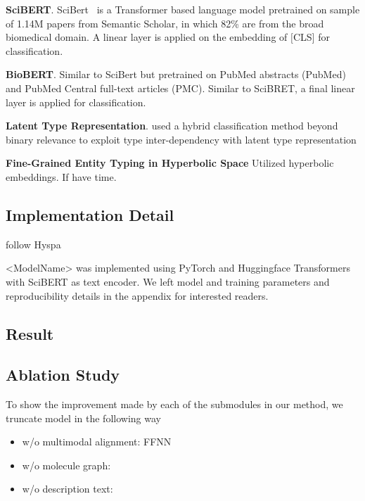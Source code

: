 \noindent \textbf{SciBERT}. SciBert~\cite{scibert} is a Transformer based language model pretrained on sample of 1.14M papers from Semantic Scholar, in which 82\% are from the broad biomedical domain. A linear layer is applied on the embedding of $[$CLS$]$ for classification.

\noindent \textbf{BioBERT}. Similar to SciBert but pretrained on PubMed abstracts (PubMed) and PubMed Central full-text articles (PMC). Similar to SciBRET, a final linear layer is applied for classification.

\noindent \textbf{Latent Type Representation}. \citet{lin2019attentive} used a hybrid classification method beyond binary relevance to exploit type inter-dependency with latent type representation

\noindent \textbf{Fine-Grained Entity Typing in Hyperbolic Space
} Utilized hyperbolic embeddings. If have time.







\subsection{Implementation Detail}

follow Hyspa

<ModelName> was implemented using PyTorch \cite{pytorch} and Huggingface Transformers \cite{huggingface} with SciBERT as text encoder. We left model and training parameters and reproducibility details in the appendix for interested readers. 

\subsection{Result}

\subsection{Ablation Study}
To show the improvement made by each of the submodules in our method, we truncate model in the following way

\begin{itemize}[noitemsep,topsep=0pt]
	
	\item w/o multimodal alignment: FFNN
	\item w/o molecule graph: 
	\item w/o description text: 
\end{itemize}



